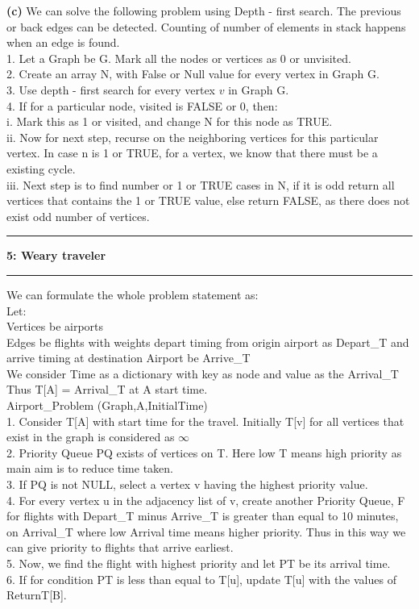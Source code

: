 \documentclass[11pt]{article}
\newcommand\question[2]{\vspace{.25in}\hrule\textbf{#1: #2}\vspace{.5em}\hrule\vspace{.10in}}
\renewcommand\part[1]{\vspace{.10in}\textbf{(#1)}}
\begin{document}
\part{c}
We can solve the following problem using Depth - first search. The previous or back edges can be detected. Counting of number of elements in stack happens when an edge is found.\\
1. Let a Graph be G. Mark all the nodes or vertices as 0 or unvisited.\\
2. Create an array N, with False or Null value for every vertex in Graph G.\\
3. Use depth - first search for every vertex $v$ in Graph G.\\
4. If for a particular node, visited is FALSE or 0, then:\\
i. Mark this as 1 or visited, and change N for this node as TRUE.\\
ii. Now for next step, recurse on the neighboring vertices for this particular vertex. In case n is 1 or TRUE, for a vertex, we know that there must be a existing cycle.\\
iii. Next step is to find number or 1 or TRUE cases in N, if it is odd return all vertices that contains the 1 or TRUE value, else return FALSE, as there does not exist odd number of vertices.\\

\question{5}{Weary traveler}
We can formulate the whole problem statement as:\\
Let:\\
Vertices be airports\\
Edges be flights with weights depart timing from origin airport as Depart\_T and arrive timing at destination Airport be Arrive\_T\\
We consider Time as a dictionary with key as node and value as the Arrival\_T\\
Thus T[A] = Arrival\_T at A start time.\\

Airport\_Problem (Graph,A,InitialTime)\\
1. Consider T[A] with start time for the travel. Initially T[v] for all vertices that exist in the graph is considered as $\infty$\\
2. Priority Queue PQ exists of vertices on T. Here low T means high priority as main aim is to reduce time taken.\\
3. If PQ is not NULL, select a vertex v having the highest priority value.\\
4. For every vertex u in the adjacency list of v, create another Priority Queue, F for flights with Depart\_T minus Arrive\_T is greater than equal to 10 minutes, on Arrival\_T where low Arrival time means higher priority. Thus in this way we can give priority to flights that arrive earliest.\\
5. Now, we find the flight with highest priority and let PT be its arrival time.\\
6. If for condition PT is less than equal to T[u], update T[u] with the values of ReturnT[B].\\
\end{document}
